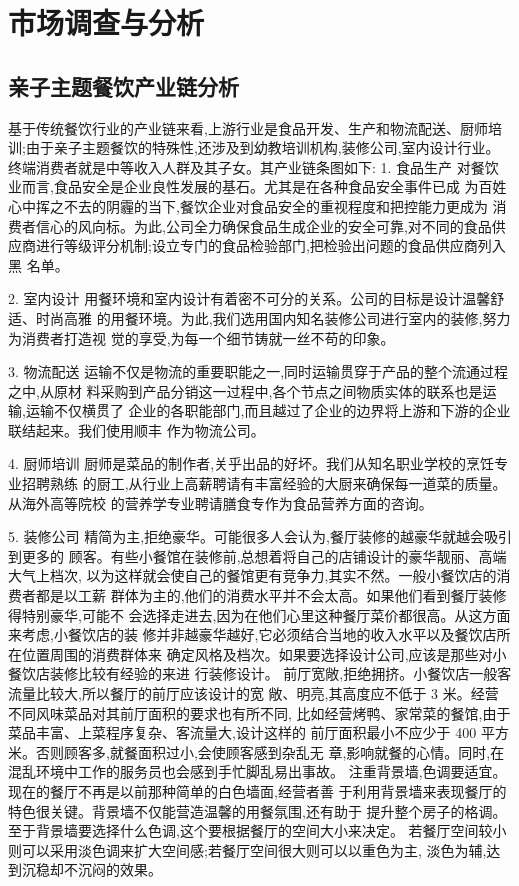 \chapter{市场调查与分析}

\section{亲子主题餐饮产业链分析}
基于传统餐饮行业的产业链来看,上游行业是食品开发、生产和物流配送、厨师培
训;由于亲子主题餐饮的特殊性,还涉及到幼教培训机构,装修公司,室内设计行业。
终端消费者就是中等收入人群及其子女。其产业链条图如下:
1. 食品生产
对餐饮业而言,食品安全是企业良性发展的基石。尤其是在各种食品安全事件已成
为百姓心中挥之不去的阴霾的当下,餐饮企业对食品安全的重视程度和把控能力更成为
消费者信心的风向标。为此,公司全力确保食品生成企业的安全可靠,对不同的食品供
应商进行等级评分机制;设立专门的食品检验部门,把检验出问题的食品供应商列入黑
名单。

2. 室内设计
用餐环境和室内设计有着密不可分的关系。公司的目标是设计温馨舒适、时尚高雅
的用餐环境。为此,我们选用国内知名装修公司进行室内的装修,努力为消费者打造视
觉的享受,为每一个细节铸就一丝不苟的印象。

3. 物流配送
运输不仅是物流的重要职能之一,同时运输贯穿于产品的整个流通过程之中,从原材
料采购到产品分销这一过程中,各个节点之间物质实体的联系也是运输,运输不仅横贯了
企业的各职能部门,而且越过了企业的边界将上游和下游的企业联结起来。我们使用顺丰
作为物流公司。

4. 厨师培训
厨师是菜品的制作者,关乎出品的好坏。我们从知名职业学校的烹饪专业招聘熟练
的厨工,从行业上高薪聘请有丰富经验的大厨来确保每一道菜的质量。从海外高等院校
的营养学专业聘请膳食专作为食品营养方面的咨询。

5. 装修公司
精简为主,拒绝豪华。可能很多人会认为,餐厅装修的越豪华就越会吸引到更多的
顾客。有些小餐馆在装修前,总想着将自己的店铺设计的豪华靓丽、高端大气上档次,
以为这样就会使自己的餐馆更有竞争力,其实不然。一般小餐饮店的消费者都是以工薪
群体为主的,他们的消费水平并不会太高。如果他们看到餐厅装修得特别豪华,可能不
会选择走进去,因为在他们心里这种餐厅菜价都很高。从这方面来考虑,小餐饮店的装
修并非越豪华越好,它必须结合当地的收入水平以及餐饮店所在位置周围的消费群体来
确定风格及档次。如果要选择设计公司,应该是那些对小餐饮店装修比较有经验的来进
行装修设计。
前厅宽敞,拒绝拥挤。小餐饮店一般客流量比较大,所以餐厅的前厅应该设计的宽
敞、明亮,其高度应不低于 3 米。经营不同风味菜品对其前厅面积的要求也有所不同,
比如经营烤鸭、家常菜的餐馆,由于菜品丰富、上菜程序复杂、客流量大,设计这样的
前厅面积最小不应少于 400 平方米。否则顾客多,就餐面积过小,会使顾客感到杂乱无
章,影响就餐的心情。同时,在混乱环境中工作的服务员也会感到手忙脚乱易出事故。
注重背景墙,色调要适宜。现在的餐厅不再是以前那种简单的白色墙面,经营者善
于利用背景墙来表现餐厅的特色很关键。背景墙不仅能营造温馨的用餐氛围,还有助于
提升整个房子的格调。至于背景墙要选择什么色调,这个要根据餐厅的空间大小来决定。
若餐厅空间较小则可以采用淡色调来扩大空间感;若餐厅空间很大则可以以重色为主,
淡色为辅,达到沉稳却不沉闷的效果。

